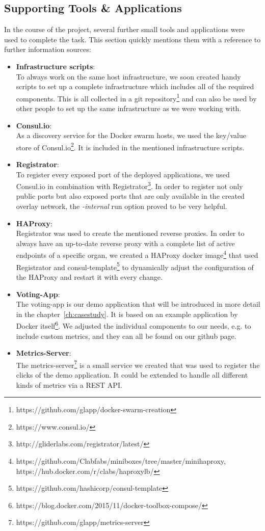 \documentclass{seal_thesis}
\begin{document}
\subsection{Supporting Tools \& Applications}\label{sec:supportingTools}
In the course of the project, several further small tools and applications were used to complete the task. This section quickly mentions them with a reference to further information sources:
\begin{itemize}
	\item \textbf{Infrastructure scripts}: \\
	To always work on the same host infrastructure, we soon created handy scripts to set up a complete infrastructure which includes all of the required components.
	This is all collected in a git repository\footnote{https://github.com/glapp/docker-swarm-creation} and can also be used by other people to set up the same infrastructure as we were working with.
	\item \textbf{Consul.io}: \\
	As a discovery service for the Docker swarm hosts, we used the key/value store of Consul.io\footnote{https://www.consul.io/}. It is included in the mentioned infrastructure scripts.
	\item \textbf{Registrator}: \\
	To register every exposed port of the deployed applications, we used Consul.io in combination with Registrator\footnote{http://gliderlabs.com/registrator/latest/}. In order to register not only public ports but also exposed ports that are only available in the created overlay network, the \textit{-internal} run option proved to be very helpful.
	\item \textbf{HAProxy}: \\
	Registrator was used to create the mentioned reverse proxies.
	In order to always have an up-to-date reverse proxy with a complete list of active endpoints of a specific organ, we created a HAProxy docker image\footnote{https://github.com/Clabfabs/miniboxes/tree/master/minihaproxy, https://hub.docker.com/r/clabs/haproxylb/} that used Registrator and consul-template\footnote{https://github.com/hashicorp/consul-template} to dynamically adjust the configuration of the HAProxy and restart it with every change.
	\item \textbf{Voting-App}: \\
	The voting-app is our demo application that will be introduced in more detail in the chapter~\ref{ch:casestudy}.
	It is based on an example application by Docker itself\footnote{https://blog.docker.com/2015/11/docker-toolbox-compose/}.
	We adjusted the individual components to our needs, e.g. to include custom metrics, and they can all be found on our github page.
	\item \textbf{Metrics-Server}: \\
	The metrics-server\footnote{https://github.com/glapp/metrics-server} is a small service we created that was used to register the clicks of the demo application.
	It could be extended to handle all different kinds of metrics via a REST API.
\end{itemize}
\end{document}
